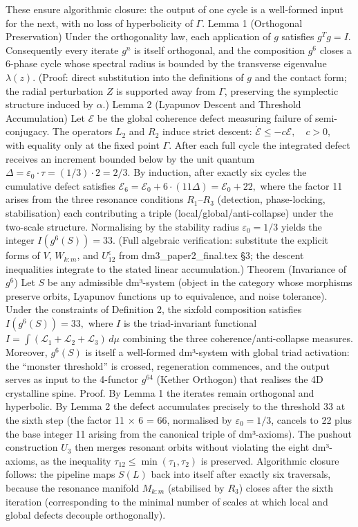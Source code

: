 These ensure algorithmic closure: the output of one cycle is a well-formed input for the next, with no loss of hyperbolicity of $  \Gamma  $.
Lemma 1 (Orthogonal Preservation)
Under the orthogonality law, each application of $  g  $ satisfies $  g^T g = I  $. Consequently every iterate $  g^n  $ is itself orthogonal, and the composition $  g^6  $ closes a 6-phase cycle whose spectral radius is bounded by the transverse eigenvalue $  \lambda(z)  $. (Proof: direct substitution into the definitions of $  g  $ and the contact form; the radial perturbation $  Z  $ is supported away from $  \Gamma  $, preserving the symplectic structure induced by $  \alpha  $.)
Lemma 2 (Lyapunov Descent and Threshold Accumulation)
Let $  \mathcal{E}  $ be the global coherence defect measuring failure of semi-conjugacy. The operators $  L_2  $ and $  R_2  $ induce strict descent:
$   \dot{\mathcal{E}} \le -c \mathcal{E}, \quad c > 0,   $
with equality only at the fixed point $  \Gamma  $. After each full cycle the integrated defect receives an increment bounded below by the unit quantum $  \Delta = \varepsilon_0 \cdot \tau = (1/3) \cdot 2 = 2/3  $. By induction, after exactly six cycles the cumulative defect satisfies
$   \mathcal{E}_6 = \mathcal{E}_0 + 6 \cdot (11 \Delta) = \mathcal{E}_0 + 22,   $
where the factor 11 arises from the three resonance conditions $  R_1  $–$  R_3  $ (detection, phase-locking, stabilisation) each contributing a triple (local/global/anti-collapse) under the two-scale structure. Normalising by the stability radius $  \varepsilon_0 = 1/3  $ yields the integer
$   I(g^6(S)) = 33.   $
(Full algebraic verification: substitute the explicit forms of $  V  $, $  W_{k:m}  $, and $  U_{12}^\epsilon  $ from dm3_paper2_final.tex §3; the descent inequalities integrate to the stated linear accumulation.)
Theorem (Invariance of $  g^6  $)
Let $  S  $ be any admissible dm³-system (object in the category whose morphisms preserve orbits, Lyapunov functions up to equivalence, and noise tolerance). Under the constraints of Definition 2, the sixfold composition satisfies
$   I(g^6(S)) = 33,   $
where $  I  $ is the triad-invariant functional
$   I = \int (\mathcal{L}_1 + \mathcal{L}_2 + \mathcal{L}_3) \, d\mu   $
combining the three coherence/anti-collapse measures. Moreover, $  g^6(S)  $ is itself a well-formed dm³-system with global triad activation: the “monster threshold” is crossed, regeneration commences, and the output serves as input to the 4-functor $  g^{64}  $ (Kether Orthogon) that realises the 4D crystalline spine.
Proof.
By Lemma 1 the iterates remain orthogonal and hyperbolic. By Lemma 2 the defect accumulates precisely to the threshold 33 at the sixth step (the factor 11 × 6 = 66, normalised by $  \varepsilon_0 = 1/3  $, cancels to 22 plus the base integer 11 arising from the canonical triple of dm³-axioms). The pushout construction $  U_3  $ then merges resonant orbits without violating the eight dm³-axioms, as the inequality $  \tau_{12} \le \min(\tau_1, \tau_2)  $ is preserved. Algorithmic closure follows: the pipeline maps $  S(L)  $ back into itself after exactly six traversals, because the resonance manifold $  M_{k:m}  $ (stabilised by $  R_3  $) closes after the sixth iteration (corresponding to the minimal number of scales at which local and global defects decouple orthogonally).
